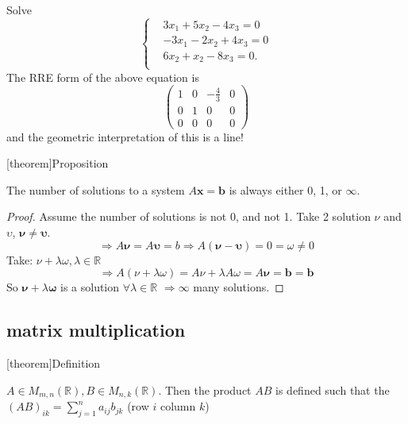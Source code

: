 \documentclass[12pt]{report}
\theoremstyle{definition}
\begin{document}
\begin{ex}
    Solve\[
        \left\{
            \begin{align*}
                & 3x_1 + 5x_2 - 4x_3 = 0 \\
                & -3x_1 - 2x_2 + 4x_3 = 0 \\
                & 6x_2 + x_2 - 8x_3 = 0. \\
            \end{align*}
            \right.
    \]
    The RRE form of the above equation is\[
        \begin{pmatrix}
            1 & 0 & -\frac{4}{3} & 0 \\
            0 & 1 & 0 & 0 \\
            0 & 0 & 0 & 0
        \end{pmatrix} 
    \]
    and the geometric interpretation of this is a line!
\end{ex}

[theorem]{Proposition}
\begin{Solutions to a system is 0, 1, infinity}
    The number of solutions to a system $A\pmb{x} = \pmb{b}$ is always either 0, 1, or $\infty$.
\end{Solutions to a system is 0, 1, infinity}

\begin{proof}
    Assume the number of solutions is not 0, and not 1.
    Take 2 solution $\nu$ and $\upsilon$, $\pmb{\nu} \neq \pmb{\upsilon}$.\[
        \Rightarrow{} A\pmb{\nu} = A\pmb{\upsilon} = b \Rightarrow{}
        A(\pmb{\nu} - \pmb{\upsilon}) = 0 = \omega \neq 0
    \]
    Take: $\nu + \lambda \omega, \lambda \in \mathbb{R}$\[
        \Rightarrow{} A(\nu + \lambda\omega) = A\nu + \lambda A\omega = A\pmb{\nu} = \pmb{b} = \pmb{b}
    \]
    So $\pmb{\nu} + \lambda \pmb{\omega}$ is a solution $\forall \lambda \in \mathbb{R}$
    $\Rightarrow{} \infty$ many solutions.
\end{proof}

\subsection{matrix multiplication}

[theorem]{Definition}
\begin{matrix multiplicatioin}
    $A \in M_{m, n}(\mathbb{R}), B \in M_{n, k}(\mathbb{R})$. Then the product $AB$
    is defined such that the ${(AB)}_{ik} = \sum_{j = 1}^{n} a_{ij}b_{jk}$ (row $i$ column $k$)
\end{matrix multiplicatioin}
\end{document}
